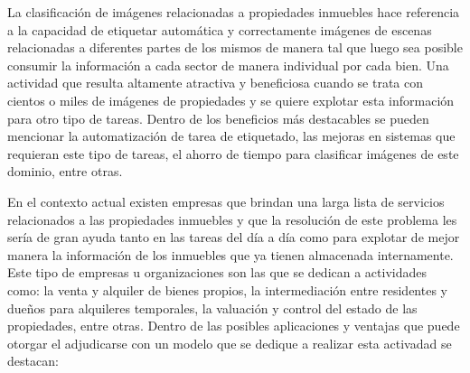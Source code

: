 La clasificación de imágenes relacionadas a propiedades inmuebles hace referencia a la capacidad de etiquetar automática y correctamente imágenes de escenas relacionadas a diferentes partes de los mismos de manera tal que luego sea posible consumir la información a cada sector de manera individual por cada bien. 
Una actividad que resulta altamente atractiva y beneficiosa cuando se trata con cientos o miles de imágenes de propiedades y se quiere explotar esta información para otro tipo de tareas. Dentro de los beneficios más destacables se pueden mencionar la automatización de tarea de etiquetado, las mejoras en sistemas que requieran este tipo de tareas, el ahorro de tiempo para clasificar imágenes de este dominio, entre otras.

En el contexto actual existen empresas que brindan una larga lista de servicios relacionados a las propiedades inmuebles y que la resolución de este problema les sería de gran ayuda tanto en las tareas del día a día como para explotar de mejor manera la información de los inmuebles que ya tienen almacenada internamente. Este tipo de empresas u organizaciones son las que se dedican a actividades como: la venta y alquiler de bienes propios, la intermediación entre residentes y dueños para alquileres temporales, la valuación y control del estado de las propiedades, entre otras.
Dentro de las posibles aplicaciones y ventajas que puede otorgar el adjudicarse con un modelo que se dedique a realizar esta activadad se destacan:
